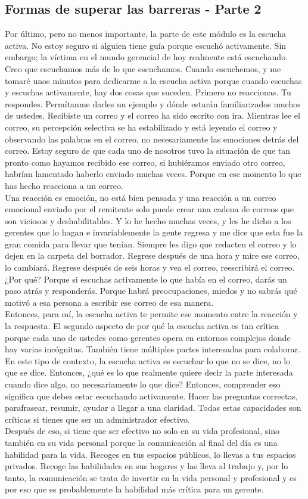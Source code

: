 \documentclass[10pt]{book}
\begin{document}
\subsection{Formas de superar las barreras - Parte 2}
Por último, pero no menos importante, la parte de este módulo es la escucha activa. No estoy seguro si alguien tiene guía porque escuchó activamente. Sin embargo; la víctima en el mundo gerencial de hoy realmente está escuchando. Creo que escuchamos más de lo que escuchamos. Cuando escuchemos, y me tomaré unos minutos para dedicarme a la escucha activa porque cuando escuchas y escuchas activamente, hay dos cosas que suceden. Primero no reaccionas. Tu respondes. Permítanme darles un ejemplo y dónde estarán familiarizados muchos de ustedes. Recibiste un correo y el correo ha sido escrito con ira. Mientras lee el correo, su percepción selectiva se ha estabilizado y está leyendo el correo y observando las palabras en el correo, no necesariamente las emociones detrás del correo. Estoy seguro de que cada uno de nosotros tuvo la situación de que tan pronto como hayamos recibido ese correo, si hubiéramos enviado otro correo, habrían lamentado haberlo enviado muchas veces. Porque en ese momento lo que has hecho reacciona a un correo.\\
Una reacción es emoción, no está bien pensada y una reacción a un correo emocional enviado por el remitente solo puede crear una cadena de correos que son viciosos y deshabilitables. Y lo he hecho muchas veces, y les he dicho a los gerentes que lo hagan e invariablemente la gente regresa y me dice que esta fue la gran comida para llevar que tenían. Siempre les digo que redacten el correo y lo dejen en la carpeta del borrador. Regrese después de una hora y mire ese correo, lo cambiará. Regrese después de seis horas y vea el correo, reescribirá el correo. ¿Por qué? Porque si escuchas activamente lo que había en el correo, darás un paso atrás y responderás. Porque habrá preocupaciones, miedos y no sabrás qué motivó a esa persona a escribir ese correo de esa manera.\\
Entonces, para mí, la escucha activa te permite ese momento entre la reacción y la respuesta. El segundo aspecto de por qué la escucha activa es tan crítica porque cada uno de ustedes como gerentes opera en entornos complejos donde hay varias incógnitas. También tiene múltiples partes interesadas para colaborar. En este tipo de contexto, la escucha activa es escuchar lo que no se dice, no lo que se dice. Entonces, ¿qué es lo que realmente quiere decir la parte interesada cuando dice algo, no necesariamente lo que dice? Entonces, comprender eso significa que debes estar escuchando activamente. Hacer las preguntas correctas, parafrasear, resumir, ayudar a llegar a una claridad. Todas estas capacidades son críticas si tienes que ser un administrador efectivo.\\
Después de eso, si tiene que ser efectivo no solo en su vida profesional, sino también en su vida personal porque la comunicación al final del día es una habilidad para la vida. Recoges en tus espacios públicos, lo llevas a tus espacios privados. Recoge las habilidades en sus hogares y las lleva al trabajo y, por lo tanto, la comunicación se trata de invertir en la vida personal y profesional y es por eso que es probablemente la habilidad más crítica para un gerente.
\end{document}
